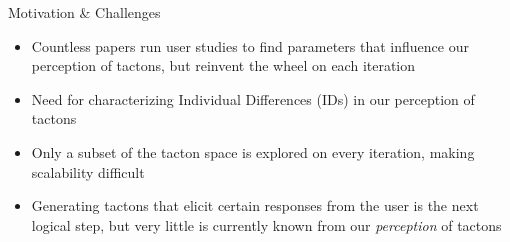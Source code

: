 

\begin{frame}{Motivation \& Challenges}

  
  \begin{itemize}
      \item Countless papers run user studies to find parameters that influence our perception of tactons, but reinvent the wheel on each iteration
      \item Need for characterizing Individual Differences (IDs) in our perception of tactons
      \item Only a subset of the tacton space is explored on every iteration, making scalability difficult
      \item Generating tactons that elicit certain responses from the user is the next logical step, but very little is currently known from our \textit{perception} of tactons
  \end{itemize}


\end{frame}
